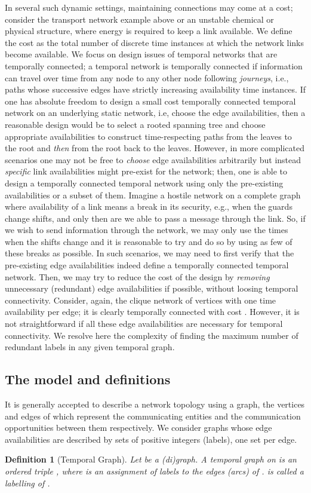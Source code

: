 \documentclass[a4paper,UKenglish]{article}
\newtheorem{definition}{Definition}
\begin{document}
In several such dynamic settings, maintaining connections may come at a cost; consider the transport network example above or an unstable chemical or physical structure, where energy is required to keep a link available. We define the cost as the total number of discrete time instances at which the network links become available. We focus on design issues of temporal networks that are temporally connected; a temporal network is temporally connected if information can travel over time from any node to any other node following \emph{journeys}, i.e., paths whose successive edges have strictly increasing availability time instances. If one has absolute freedom to design a small cost temporally connected temporal network on an underlying static network, i.e, choose the edge availabilities, then a reasonable design would be to select a rooted spanning tree and choose appropriate availabilities to construct time-respecting paths from the leaves to the root and \emph{then} from the root back to the leaves. However, in more complicated scenarios one may not be free to \emph{choose} edge availabilities arbitrarily but instead \emph{specific} link availabilities might pre-exist for the network; then, one is able to design a temporally connected temporal network using only the pre-existing availabilities or a subset of them. Imagine a hostile network on a complete graph where availability of a link means a break in its security, e.g., when the guards change shifts, and only then are we able to pass a message through the link. So, if we wish to send information through the network, we may only use the times when the shifts change and it is reasonable to try and do so by using as few of these breaks as possible. In such scenarios, we may need to first verify that the pre-existing edge availabilities indeed define a temporally connected temporal network. Then, we may try to reduce the cost of the design by \emph{removing} unnecessary (redundant) edge availabilities if possible, without loosing temporal connectivity. Consider, again, the clique network of  vertices with one time availability per edge; it is clearly temporally connected with cost . However, it is not straightforward if all these edge availabilities are necessary for temporal connectivity. We resolve here the complexity of finding the maximum number of redundant labels in any given temporal graph.

\subsection{The model and definitions}
It is generally accepted to describe a network topology using a graph, the vertices and edges of which represent the communicating entities and the communication opportunities between them respectively. We consider graphs whose edge availabilities are described by sets of positive integers (labels), one set per edge.
\begin{definition}[Temporal Graph]
Let  be a (di)graph. A temporal graph on  is an ordered triple , where  is an \emph{assignment} of labels to the edges (arcs) of .  is called a \emph{labelling} of .
\end{definition}
\end{document}
